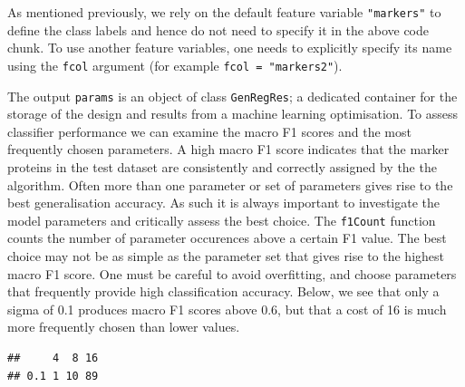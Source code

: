 \begin{knitrout}
\color{fgcolor}\begin{kframe}
\begin{alltt}
 \hlkwb{<-}   \hlstd{=} \hlstd{,}
                           \hlstd{=} \hlstd{,}  \hlstd{=} \hlstd{,}
                           
\end{alltt}
\end{kframe}
\end{knitrout}

As mentioned previously, we rely on the default feature variable
\texttt{"markers"} to define the class labels and hence do not need to
specify it in the above code chunk.  To use another feature variables,
one needs to explicitly specify its name using the \texttt{fcol}
argument (for example \texttt{fcol = "markers2"}).

The output \texttt{params} is an object of class \texttt{GenRegRes}; a
dedicated container for the storage of the design and results from a
machine learning optimisation. To assess classifier performance we can
examine the macro F1 scores and the most frequently chosen
parameters. A high macro F1 score indicates that the marker proteins
in the test dataset are consistently and correctly assigned by the the
algorithm. Often more than one parameter or set of parameters gives
rise to the best generalisation accuracy. As such it is always
important to investigate the model parameters and critically assess
the best choice. The \texttt{f1Count} function counts the number of
parameter occurences above a certain F1 value. The best choice may not
be as simple as the parameter set that gives rise to the highest macro
F1 score. One must be careful to avoid overfitting, and choose
parameters that frequently provide high classification
accuracy. Below, we see that only a sigma of 0.1 produces macro F1
scores above 0.6, but that a cost of 16 is much more frequently chosen
than lower values.

\begin{knitrout}
\color{fgcolor}\begin{kframe}
\begin{alltt}
 \hlstd{)}
\end{alltt}
\begin{verbatim}
##     4  8 16
## 0.1 1 10 89
\end{verbatim}
\end{kframe}
\end{knitrout}

